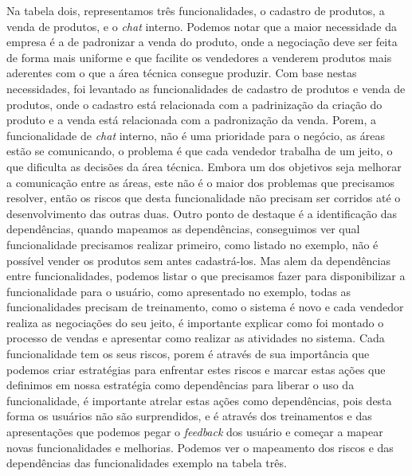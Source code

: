     Na tabela dois, representamos três funcionalidades, o cadastro de produtos,
    a venda de produtos, e o \textit{chat} interno. Podemos notar que a maior necessidade
    da empresa é a de padronizar a venda do produto, onde a negociação deve ser
    feita de forma mais uniforme e que facilite os vendedores a venderem produtos
    mais aderentes com o que a área técnica consegue produzir. Com base nestas
    necessidades, foi levantado as funcionalidades de cadastro de produtos e
    venda de produtos, onde o cadastro está relacionada com a padrinização da
    criação do produto e a venda está relacionada com a padronização da venda.
    Porem, a funcionalidade de \textit{chat} interno, não é uma prioridade para
    o negócio, as áreas estão se comunicando, o problema é que cada vendedor
    trabalha de um jeito, o que dificulta as decisões da área técnica. Embora um
    dos objetivos seja melhorar a comunicação entre as áreas, este não é o maior
    dos problemas que precisamos resolver, então os riscos que desta funcionalidade
    não precisam ser corridos até o desenvolvimento das outras duas. \newline
    Outro ponto de destaque é a identificação das dependências, quando mapeamos
    as dependências, conseguimos ver qual funcionalidade precisamos realizar
    primeiro, como listado no exemplo, não é possível vender os produtos sem antes
    cadastrá-los. Mas alem da dependências entre funcionalidades, podemos listar
    o que precisamos fazer para disponibilizar a funcionalidade para o usuário,
    como apresentado no exemplo, todas as funcionalidades precisam de treinamento,
    como o sistema é novo e cada vendedor realiza as negociações do seu jeito,
    é importante explicar como foi montado o processo de vendas e apresentar
    como realizar as atividades no sistema. \newline
    Cada funcionalidade tem os seus riscos, porem é através de sua importância que
    podemos criar estratégias para enfrentar estes riscos e marcar estas ações
    que definimos em nossa estratégia como dependências para liberar o uso da
    funcionalidade, é importante atrelar estas ações como dependências, pois desta
    forma os usuários não são surprendidos, e é através dos treinamentos e das
    apresentações que podemos pegar o \textit{feedback} dos usuário e começar a
    mapear novas funcionalidades e melhorias. Podemos ver o mapeamento dos riscos
    e das dependências das funcionalidades exemplo na tabela três.\newline

